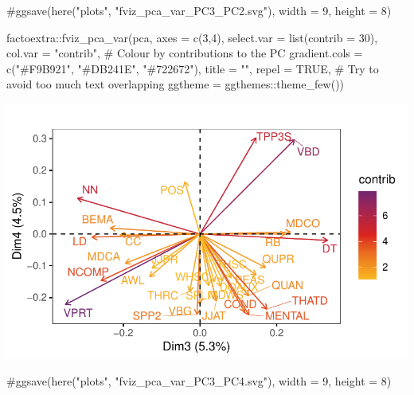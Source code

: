\documentclass[
  letterpaper,
  DIV=11,
  numbers=noendperiod]{scrreprt}
\newenvironment{Shaded}{\begin{snugshade}}{\end{snugshade}}
\newcommand{\AttributeTok}[1]{\textcolor[rgb]{0.40,0.45,0.13}{#1}}
\newcommand{\CommentTok}[1]{\textcolor[rgb]{0.37,0.37,0.37}{#1}}
\newcommand{\ConstantTok}[1]{\textcolor[rgb]{0.56,0.35,0.01}{#1}}
\newcommand{\DecValTok}[1]{\textcolor[rgb]{0.68,0.00,0.00}{#1}}
\newcommand{\FunctionTok}[1]{\textcolor[rgb]{0.28,0.35,0.67}{#1}}
\newcommand{\NormalTok}[1]{\textcolor[rgb]{0.00,0.23,0.31}{#1}}
\newcommand{\SpecialCharTok}[1]{\textcolor[rgb]{0.37,0.37,0.37}{#1}}
\newcommand{\StringTok}[1]{\textcolor[rgb]{0.13,0.47,0.30}{#1}}
\begin{document}
\begin{Shaded}
\begin{Highlighting}[]
\CommentTok{\#ggsave(here("plots", "fviz\_pca\_var\_PC3\_PC2.svg"), width = 9, height = 8)}

\NormalTok{factoextra}\SpecialCharTok{::}\FunctionTok{fviz\_pca\_var}\NormalTok{(pca,}
             \AttributeTok{axes =} \FunctionTok{c}\NormalTok{(}\DecValTok{3}\NormalTok{,}\DecValTok{4}\NormalTok{),}
             \AttributeTok{select.var =} \FunctionTok{list}\NormalTok{(}\AttributeTok{contrib =} \DecValTok{30}\NormalTok{),}
             \AttributeTok{col.var =} \StringTok{"contrib"}\NormalTok{, }\CommentTok{\# Colour by contributions to the PC}
             \AttributeTok{gradient.cols =} \FunctionTok{c}\NormalTok{(}\StringTok{"\#F9B921"}\NormalTok{, }\StringTok{"\#DB241E"}\NormalTok{, }\StringTok{"\#722672"}\NormalTok{),}
             \AttributeTok{title =} \StringTok{""}\NormalTok{,}
             \AttributeTok{repel =} \ConstantTok{TRUE}\NormalTok{, }\CommentTok{\# Try to avoid too much text overlapping}
             \AttributeTok{ggtheme =}\NormalTok{ ggthemes}\SpecialCharTok{::}\FunctionTok{theme\_few}\NormalTok{())}
\end{Highlighting}
\end{Shaded}

\includegraphics{E_Ch6_Analysis_files/figure-pdf/graphs-of-variables-3.pdf}

\begin{Shaded}
\begin{Highlighting}[]
\CommentTok{\#ggsave(here("plots", "fviz\_pca\_var\_PC3\_PC4.svg"), width = 9, height = 8)}
\end{Highlighting}
\end{Shaded}
\end{document}
